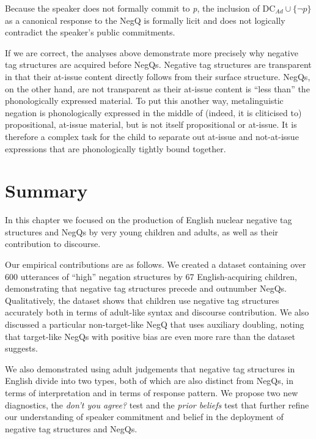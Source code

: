 \documentclass[output=paper,colorlinks,citecolor=brown]{langscibook}
\begin{document}
Because the speaker does not formally commit to \textit{p}, the inclusion of DC$_{Ad}\cup\{\neg{p}\}$ as a canonical response to the NegQ is formally licit and does not logically contradict the speaker's public commitments.

If we are correct, the analyses above demonstrate more precisely why negative tag structures are acquired before NegQs. Negative tag structures are transparent in that their at-issue content directly follows from their surface structure. NegQs, on the other hand, are not transparent as their at-issue content is ``less than'' the phonologically expressed material. To put this another way, metalinguistic negation is phonologically expressed in the middle of (indeed, it is cliticised to) propositional, at-issue material, but is not itself propositional or at-issue. It is therefore a complex task for the child to separate out at-issue and not-at-issue expressions that are phonologically tightly bound together.


\section{Summary}\label{summary}

In this chapter we focused on the production of English nuclear negative tag structures and NegQs by very young children and adults, as well as their contribution to discourse. 

Our empirical contributions are as follows. We created a dataset containing over 600 utterances of ``high'' negation structures by 67 English-acquiring children, demonstrating that negative tag structures precede and outnumber NegQs. Qualitatively, the dataset shows that children use negative tag structures accurately both in terms of adult-like syntax and discourse contribution. We also discussed a particular non-target-like NegQ that uses auxiliary doubling, noting that target-like NegQs with positive bias are even more rare than the dataset suggests.

We also demonstrated using adult judgements that negative tag structures in English divide into two types, both of which are also distinct from NegQs, in terms of interpretation and in terms of response pattern. We propose two new diagnostics, the \textit{don't you agree?} test and the \textit{prior beliefs }test that further refine our understanding of speaker commitment and belief in the deployment of negative tag structures and NegQs.
\end{document}
